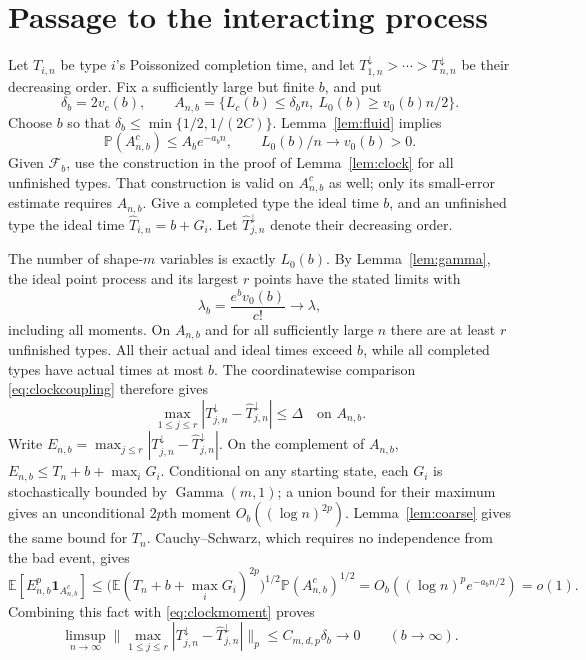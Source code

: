 \documentclass[11pt]{article}
\theoremstyle{remark}\newtheorem{remark}[theorem]{Remark}
\newcommand{\Pbb}{\mathbb P}
\newcommand{\Ebb}{\mathbb E}
\newcommand{\Fcal}{\mathcal F}
\newcommand{\one}{\mathbf 1}
\newcommand{\norm}[1]{\lVert #1\rVert}
\begin{document}
\section{Passage to the interacting process}
Let $T_{i,n}$ be type $i$'s Poissonized completion time, and let
$T_{1,n}^{\downarrow}>\cdots>T_{n,n}^{\downarrow}$ be their decreasing order.
Fix a sufficiently large but finite $b$, and put
\[
 \delta_b=2v_c(b),\qquad
 A_{n,b}=\{L_c(b)\le\delta_b n,\ L_0(b)\ge v_0(b)n/2\}.
\]
Choose $b$ so that $\delta_b\le\min\{1/2,1/(2C)\}$.
Lemma~\ref{lem:fluid} implies
\begin{equation}\label{eq:good}
 \Pbb(A_{n,b}^c)\le A_b e^{-a_b n},\qquad
 L_0(b)/n\longrightarrow v_0(b)>0.
\end{equation}
Given $\Fcal_b$, use the construction in the proof of
Lemma~\ref{lem:clock} for all unfinished types. That construction is valid
on $A_{n,b}^c$ as well; only its small-error estimate requires $A_{n,b}$.
Give a completed type the ideal time $b$, and an
unfinished type the ideal time $\widehat T_{i,n}=b+G_i$.
Let $\widehat T_{j,n}^{\downarrow}$ denote their decreasing order.

The number of shape-$m$ variables is exactly $L_0(b)$. By
Lemma~\ref{lem:gamma}, the ideal point process and its largest $r$ points
have the stated limits with
\begin{equation}\label{eq:lambdab}
 \lambda_b=\frac{e^b v_0(b)}{c!}\longrightarrow\lambda,
\end{equation}
including all moments. On $A_{n,b}$ and for all sufficiently large $n$ there
are at least $r$ unfinished types. All their actual and ideal times exceed
$b$, while all completed types have actual times at most $b$.
The coordinatewise comparison \eqref{eq:clockcoupling} therefore gives
\begin{equation}\label{eq:sorterror}
 \max_{1\le j\le r}|T_{j,n}^{\downarrow}
                 -\widehat T_{j,n}^{\downarrow}|\le\Delta
       \quad\text{on }A_{n,b}.
\end{equation}
Write $E_{n,b}=\max_{j\le r}|T_{j,n}^{\downarrow}
-\widehat T_{j,n}^{\downarrow}|$. On the complement of $A_{n,b}$,
$E_{n,b}\le T_n+b+\max_iG_i$. Conditional on any starting state, each
$G_i$ is stochastically bounded by $\operatorname{Gamma}(m,1)$; a union
bound for their maximum gives an unconditional $2p$th moment
$O_b((\log n)^{2p})$. Lemma~\ref{lem:coarse} gives the same bound for $T_n$.
Cauchy--Schwarz, which requires no independence from the bad event, gives
\begin{equation}\label{eq:badmoment}
 \Ebb[E_{n,b}^p\one_{A_{n,b}^c}]
 \le \bigl(\Ebb(T_n+b+\max_iG_i)^{2p}\bigr)^{1/2}
       \Pbb(A_{n,b}^c)^{1/2}
 =O_b((\log n)^p e^{-a_b n/2})=o(1).
\end{equation}
Combining this fact with \eqref{eq:clockmoment} proves
\begin{equation}\label{eq:Lpapprox}
 \limsup_{n\to\infty}
 \norm{\max_{1\le j\le r}|T_{j,n}^{\downarrow}
                 -\widehat T_{j,n}^{\downarrow}|}_p
 \le C_{m,d,p}\delta_b\longrightarrow0\qquad(b\to\infty).
\end{equation}
\end{document}
